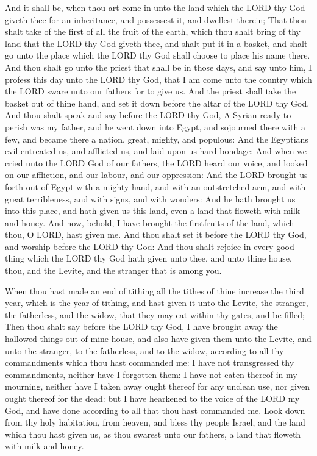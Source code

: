  And it shall be, when thou art come in unto the land which
the LORD thy God giveth thee for an inheritance, and possessest it, and
dwellest therein;  That thou shalt take of the first of all
the fruit of the earth, which thou shalt bring of thy land that the LORD
thy God giveth thee, and shalt put it in a basket, and shalt go unto the
place which the LORD thy God shall choose to place his name there.
 And thou shalt go unto the priest that shall be in those
days, and say unto him, I profess this day unto the LORD thy God, that I
am come unto the country which the LORD sware unto our fathers for to
give us.  And the priest shall take the basket out of thine
hand, and set it down before the altar of the LORD thy God. 
And thou shalt speak and say before the LORD thy God, A Syrian ready to
perish was my father, and he went down into Egypt, and sojourned there
with a few, and became there a nation, great, mighty, and populous:
 And the Egyptians evil entreated us, and afflicted us, and
laid upon us hard bondage:  And when we cried unto the LORD
God of our fathers, the LORD heard our voice, and looked on our
affliction, and our labour, and our oppression:  And the
LORD brought us forth out of Egypt with a mighty hand, and with an
outstretched arm, and with great terribleness, and with signs, and with
wonders:  And he hath brought us into this place, and hath
given us this land, even a land that floweth with milk and honey.
 And now, behold, I have brought the firstfruits of the
land, which thou, O LORD, hast given me. And thou shalt set it before
the LORD thy God, and worship before the LORD thy God:  And
thou shalt rejoice in every good thing which the LORD thy God hath given
unto thee, and unto thine house, thou, and the Levite, and the stranger
that is among you.

 When thou hast made an end of tithing all the tithes of
thine increase the third year, which is the year of tithing, and hast
given it unto the Levite, the stranger, the fatherless, and the widow,
that they may eat within thy gates, and be filled;  Then
thou shalt say before the LORD thy God, I have brought away the hallowed
things out of mine house, and also have given them unto the Levite, and
unto the stranger, to the fatherless, and to the widow, according to all
thy commandments which thou hast commanded me: I have not transgressed
thy commandments, neither have I forgotten them:  I have
not eaten thereof in my mourning, neither have I taken away ought
thereof for any unclean use, nor given ought thereof for the dead: but I
have hearkened to the voice of the LORD my God, and have done according
to all that thou hast commanded me.  Look down from thy
holy habitation, from heaven, and bless thy people Israel, and the land
which thou hast given us, as thou swarest unto our fathers, a land that
floweth with milk and honey.

